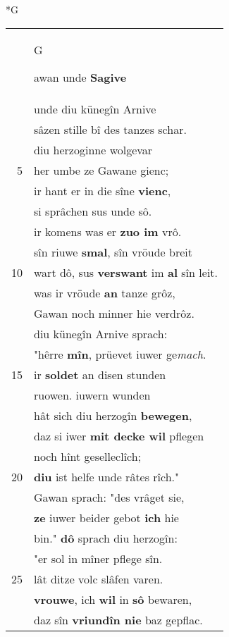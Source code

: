 \documentclass[8pt,a4paper,notitlepage]{article}
\begin{document}
\newpage
\begin{table}[ht]
\begin{minipage}[t]{0.5\linewidth}
\small
\begin{center}*G
\end{center}
\begin{tabular}{rl}
 & \begin{large}G\end{large}awan unde \textbf{Sagive}\\ 
 & unde diu künegîn Arnive\\ 
 & sâzen stille bî des tanzes schar.\\ 
 & diu herzoginne wolgevar\\ 
5 & her umbe ze Gawane gienc;\\ 
 & ir hant er in die sîne \textbf{vienc},\\ 
 & si sprâchen sus unde sô.\\ 
 & ir komens was er \textbf{zuo im} vrô.\\ 
 & sîn riuwe \textbf{smal}, sîn vröude breit\\ 
10 & wart dô, sus \textbf{verswant} im \textbf{al} sîn leit.\\ 
 & was ir vröude \textbf{an} tanze grôz,\\ 
 & Gawan noch minner hie verdrôz.\\ 
 & diu künegîn Arnive sprach:\\ 
 & "hêrre \textbf{mîn}, prüevet iuwer ge\textit{mach}.\\ 
15 & ir \textbf{soldet} an disen stunden\\ 
 & ruowen.  iuwern wunden\\ 
 & hât sich diu herzogîn \textbf{bewegen},\\ 
 & daz si iwer \textbf{mit decke wil} pflegen\\ 
 & noch hînt geselleclîch;\\ 
20 & \textbf{diu} ist helfe unde râtes rîch."\\ 
 & Gawan sprach: "des vrâget sie,\\ 
 & \textbf{ze} iuwer beider gebot \textbf{ich} hie\\ 
 & bin." \textbf{dô} sprach diu herzogîn:\\ 
 & "er sol in mîner pflege sîn.\\ 
25 & lât ditze volc slâfen varen.\\ 
 & \textbf{vrouwe}, ich \textbf{wil} in \textbf{sô} bewaren,\\ 
 & daz sîn \textbf{vriundîn nie} baz gepflac.\\ 

\end{tabular}
\end{minipage}
\end{table}
\end{document}
